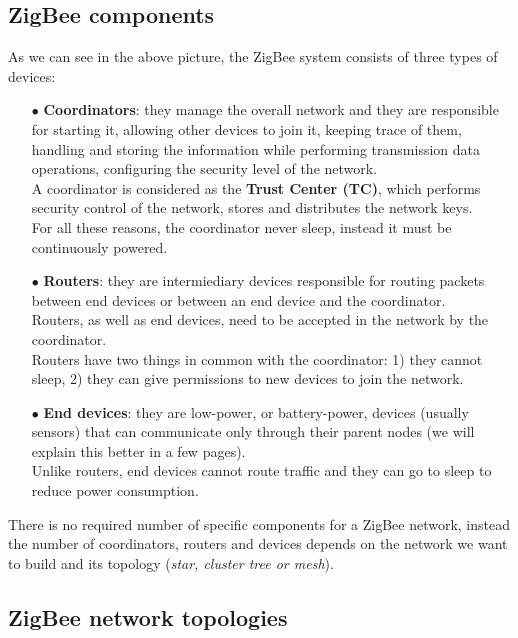 \documentclass[12pt]{report}
\begin{document}
{\bigskip
\subsection{ZigBee components}
\bigskip

As we can see in the above picture, the ZigBee system consists of three types of devices:

\begin{itemize}
\setlength{\itemindent}{+4mm}
\item[$\bullet$] \textbf{Coordinators}: they manage the overall network and they are responsible for starting it, allowing other devices to join it, keeping trace of them, handling and storing the information while performing transmission data operations, configuring the security level of the network.\\
A coordinator is considered as the \textbf{Trust Center (TC)}, which performs security control of the network, stores and distributes the network keys.\\
For all these reasons, the coordinator never sleep, instead it must be continuously powered.


\item[$\bullet$] \textbf{Routers}: they are intermiediary devices responsible for routing packets between end devices or between an end device and the coordinator.\\
Routers, as well as end devices, need to be accepted in the network by the coordinator.\\
Routers have two things in common with the coordinator: 1) they cannot sleep, 2) they can give permissions to new devices to join the network.

\item[$\bullet$] \textbf{End devices}: they are low-power, or battery-power, devices (usually sensors) that can communicate only through their parent nodes (we will explain this better in a few pages).\\
Unlike routers, end devices cannot route traffic and they can go to sleep to reduce power consumption.
\end{itemize}

There is no required number of specific components for a ZigBee network, instead the number of coordinators, routers and devices depends on the network we want to build and its topology (\textit{star, cluster tree or mesh}).

\subsection{ZigBee network topologies}

}
\end{document}
